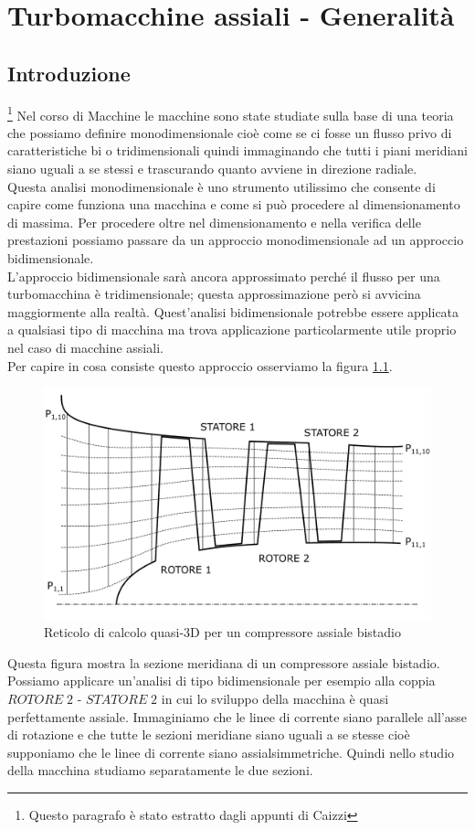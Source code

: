 \chapter{Turbomacchine assiali - Generalità}

\section{Introduzione}
\footnote{Questo paragrafo è stato estratto dagli appunti di Caizzi} Nel corso di Macchine le macchine sono state studiate sulla base di una teoria
che possiamo definire monodimensionale cioè come se ci fosse un flusso privo di caratteristiche bi o tridimensionali quindi immaginando che tutti i piani meridiani siano uguali a se stessi e trascurando quanto avviene in direzione
radiale.\\
Questa analisi monodimensionale è uno strumento utilissimo che consente di capire come funziona una macchina e come si può procedere al dimensionamento di massima. Per procedere oltre nel dimensionamento e nella verifica delle prestazioni possiamo passare da un approccio monodimensionale ad un approccio bidimensionale.\\
L’approccio bidimensionale sarà ancora approssimato perché il flusso per una turbomacchina è tridimensionale; questa approssimazione però si avvicina maggiormente alla realtà. Quest'analisi bidimensionale potrebbe essere applicata a qualsiasi tipo di macchina ma trova applicazione particolarmente utile proprio nel caso di macchine assiali.\\
Per capire in cosa consiste questo approccio osserviamo la figura \ref{fig:ReticoloComp}.
\begin{figure}
\centering
  \includegraphics[width=.8\textwidth]{fig/ReticoloComp.pdf}
\caption{Reticolo di calcolo quasi-3D per un compressore assiale bistadio}
\label{fig:ReticoloComp}
\end{figure}
Questa figura mostra la sezione meridiana di un compressore assiale bistadio. Possiamo applicare un’analisi di tipo bidimensionale per esempio alla coppia $ROTORE\;2$ - $STATORE\;2$ in cui lo sviluppo della macchina è quasi perfettamente assiale. Immaginiamo che le linee di corrente siano parallele all'asse di rotazione e che tutte le sezioni meridiane siano uguali a se stesse cioè supponiamo che le linee di corrente siano assialsimmetriche. Quindi nello studio della macchina studiamo separatamente le due sezioni.\\
